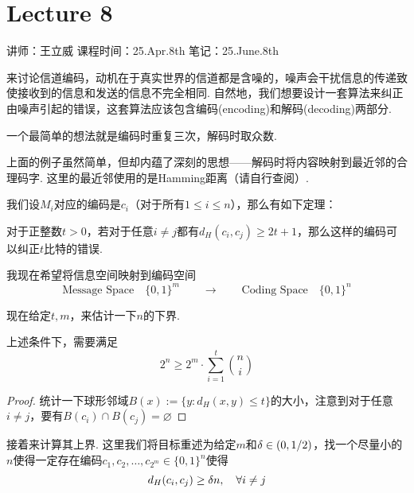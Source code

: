 \chapter{Lecture 8}

\begin{center}
    讲师：王立威 \qquad
    课程时间：25.Apr.8th \qquad 
    笔记：25.June.8th
\end{center}

\bigskip

来讨论信道编码，动机在于真实世界的信道都是含噪的，噪声会干扰信息的传递致使接收到的信息和发送的信息不完全相同. 自然地，我们想要设计一套算法来纠正由噪声引起的错误，这套算法应该包含编码(encoding)和解码(decoding)两部分. 

\begin{example}
    一个最简单的想法就是编码时重复三次，解码时取众数. 
\end{example}

上面的例子虽然简单，但却内蕴了深刻的思想——解码时将内容映射到最近邻的合理码字. 这里的最近邻使用的是Hamming距离（请自行查阅）. 

我们设$M_i$对应的编码是$c_i$（对于所有$1 \le i \le n$），那么有如下定理：
\begin{theorem}
    对于正整数$t > 0$，若对于任意$i\neq j$都有$d_H(c_i,c_j) \ge 2t + 1$，那么这样的编码可以纠正$t$比特的错误. 
\end{theorem}

我现在希望将信息空间映射到编码空间 
\[
\text{Message Space} \quad \{0,1\}^m \quad \quad \longrightarrow \quad \quad
\text{Coding Space} \quad \{0,1\}^n 
\]

现在给定$t,m$，来估计一下$n$的下界. 
\begin{proposition}
    上述条件下，需要满足 
    \[
    2^n \ge 2^m \cdot {\sum_{i=1}^t \binom{n}{i}}
    \]
\end{proposition}
\begin{proof}
统计一下球形邻域$B(x):= \{y:d_H(x,y) \le t\}$的大小，注意到对于任意$i\neq j$，要有$B(c_i)\cap B(c_j) = \varnothing$
\end{proof}

接着来计算其上界. 这里我们将目标重述为给定$m$和$ \delta \in (0, 1/2)$，找一个尽量小的$n$使得一定存在编码$c_1, c_2, \dots, c_{2^m} \in \{0,1\}^n$使得
\[
d_H(c_i, c_j) \ge \delta n , \quad \forall i \neq j
\]

